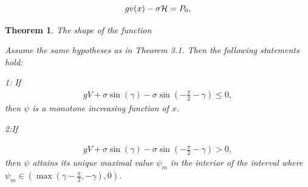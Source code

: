 \documentclass[10pt,a4paper]{amsart}
\newtheorem{theorem}{Theorem}
\begin{document}
     \begin{equation}{\label{equ:3.1.1}}
         gv(x)-\sigma \mathcal{H}=P_{0},
     \end{equation}

    \begin{theorem}{The shape of the function }

Assume the same hypotheses as in Theorem 3.1. Then the following statements hold:
    
    1: If
    \begin{align}
        gV+\sigma \sin(\gamma)-\sigma \sin(-\frac{\pi}{2}-\gamma)\leq 0, 
    \end{align}
     then $\psi$ is a monotone increasing function of $x$.

    2:If

    \begin{align}
        gV+\sigma \sin(\gamma)-\sigma \sin(-\frac{\pi}{2}-\gamma)>0,
    \end{align}
      then $\psi$ attains its unique maximal value $\psi_m$ in the interior of the interval where $ \psi_m\in(\max(\gamma-\frac{\pi}{2},-\gamma),0)$. 
    \end{theorem}
\end{document}
